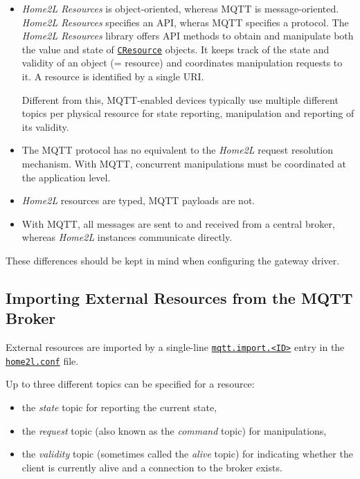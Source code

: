 \documentclass[12pt,english,parskip=half,headheight=19pt]{scrreprt}
\newcommand{\idx}[1]{#1\index{#1}}
\newcommand{\refenv}[1]{\hyperref[env:#1]{\texttt{#1}}}        %
\newcommand{\reftool}[1]{\hyperref[tool:#1]{\texttt{\idx{#1}}}}
\newcommand{\refapic}[1]{\href{home2l-api_c/index.html}{\mbox{\texttt{#1}}}}            %
\begin{document}
\begin{itemize}

  \item
    \textit{Home2L Resources} is object-oriented, whereas MQTT is message-oriented. \textit{Home2L Resources}
    specifies an API, wheras MQTT specifies a protocol. The \textit{Home2L Resources} library offers API methods to
    obtain and manipulate both the value and state of \refapic{CResource} objects. It keeps track of the state and
    validity of an object (= resource) and coordinates manipulation requests to it. A resource is identified by a single
    URI.

    Different from this, MQTT-enabled devices typically use multiple different topics per physical resource for
    state reporting, manipulation and reporting of its validity.

  \item
    The MQTT protocol has no equivalent to the \textit{Home2L} request resolution mechanism. With MQTT, concurrent
    manipulations must be coordinated at the application level.

  \item
    \textit{Home2L} resources are typed, MQTT payloads are not.

  \item
    With MQTT, all messages are sent to and received from a central broker, whereas \textit{Home2L} instances
    communicate directly.

\end{itemize}

These differences should be kept in mind when configuring the gateway driver.



\subsection{Importing External Resources from the MQTT Broker}
\label{sec:drvlib-mqtt-importing}

External resources are imported by a single-line \refenv{mqtt.import.<ID>} entry in the \reftool{home2l.conf} file.

Up to three different topics can be specified for a resource:
\begin{itemize}
  \item the \textit{state} topic for reporting the current state,
  \item the \textit{request} topic (also known as the \textit{command} topic) for manipulations,
  \item the \textit{validity} topic (sometimes called the \textit{alive} topic) for indicating whether the client
      is currently alive and a connection to the broker exists.
\end{itemize}
\end{document}
